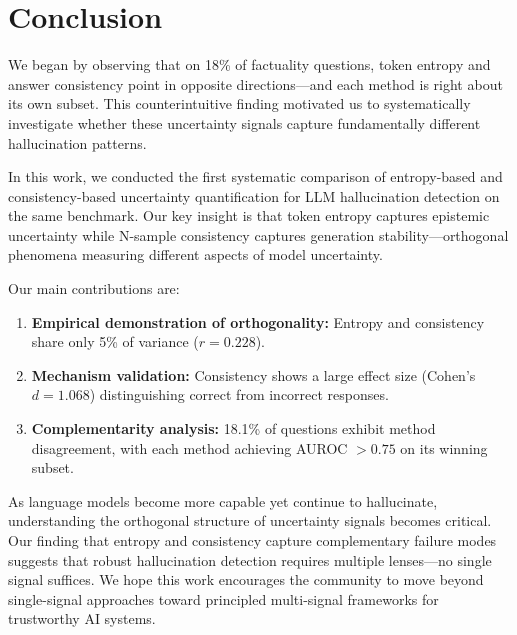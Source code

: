 \section{Conclusion}
\label{sec:conclusion}

We began by observing that on 18\% of factuality questions, token entropy and answer consistency point in opposite directions---and each method is right about its own subset. This counterintuitive finding motivated us to systematically investigate whether these uncertainty signals capture fundamentally different hallucination patterns.

In this work, we conducted the first systematic comparison of entropy-based and consistency-based uncertainty quantification for LLM hallucination detection on the same benchmark. Our key insight is that token entropy captures epistemic uncertainty while N-sample consistency captures generation stability---orthogonal phenomena measuring different aspects of model uncertainty.

Our main contributions are:

\begin{enumerate}
    \item \textbf{Empirical demonstration of orthogonality:} Entropy and consistency share only 5\% of variance ($r = 0.228$).

    \item \textbf{Mechanism validation:} Consistency shows a large effect size (Cohen's $d = 1.068$) distinguishing correct from incorrect responses.

    \item \textbf{Complementarity analysis:} 18.1\% of questions exhibit method disagreement, with each method achieving AUROC $> 0.75$ on its winning subset.
\end{enumerate}

As language models become more capable yet continue to hallucinate, understanding the orthogonal structure of uncertainty signals becomes critical. Our finding that entropy and consistency capture complementary failure modes suggests that robust hallucination detection requires multiple lenses---no single signal suffices. We hope this work encourages the community to move beyond single-signal approaches toward principled multi-signal frameworks for trustworthy AI systems.
